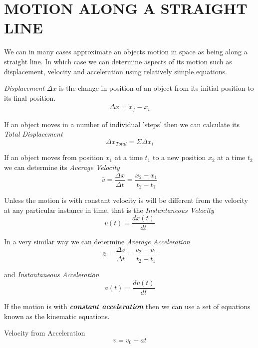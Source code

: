 \documentclass[12pt, letterpaper, twoside]{article}
\begin{document}
\section{MOTION ALONG A STRAIGHT LINE}

\bigskip

We can in many cases approximate an objects motion in space as being along a straight line.  In which case we can determine aspects of its motion such as displacement, velocity and acceleration using relatively simple equations.
 \bigskip
 
\emph{Displacement} $\Delta x$ is the change in position of an object from its initial position to its final position.  
\begin{align}
\Delta x = x_f - x_i
\end{align}



If an object moves in a number of individual 'steps' then we can calculate its \emph{Total Displacement}
\begin{equation}
\Delta x_{Total} = \Sigma \Delta x_i
\end{equation}

If an object moves from position $x_1$ at a time $t_1$ to a new position $x_2$ at a time $t_2$ we can determine its \emph{Average Velocity}
\begin{equation}
\bar{v} = \frac{\Delta x}{\Delta t} = \frac{x_2 - x_1}{t_2 - t_1}
\end{equation}


Unless the motion is with constant velocity is  will be  different from the velocity at any particular instance in time, that is the \emph{Instantaneous Velocity}
\begin{equation}
v(t) = \frac{dx(t)}{dt}
\end{equation}


In a very similar way we can determine\emph{ Average Acceleration}
\begin{equation}
\bar{a} = \frac{\Delta v}{\Delta t} = \frac{v_2 - v_1}{t_2 - t_1}
\end{equation}

and \emph{Instantaneous Acceleration}
\begin{equation}
a(t) = \frac{dv(t)}{dt}
\end{equation}


\bigskip
If the motion is with \textbf{\emph{constant acceleration}} then we can use a set of equations known as the kinematic equations.
\bigskip

Velocity from Acceleration
\begin{equation}
v = v_0 + at
\end{equation}
\end{document}

